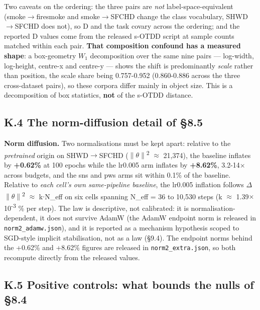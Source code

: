 \documentclass[pdflatex,sn-mathphys-ay]{sn-jnl}
\begin{document}
Two caveats on the ordering: the three pairs are \emph{not} label-space-equivalent (smoke\ensuremath{\rightarrow}firesmoke and smoke\ensuremath{\rightarrow}SFCHD change the class vocabulary, SHWD\ensuremath{\rightarrow}SFCHD does not), so D and the task covary across the ordering; and the reported D values come from the released s-OTDD script at sample counts matched within each pair. \textbf{That composition confound has a measured shape}: a box-geometry $W_1$ decomposition over the same nine pairs --- log-width, log-height, centre-x and centre-y --- shows the shift is predominantly \emph{scale} rather than position, the scale share being 0.757-0.952 (0.860-0.886 across the three cross-dataset pairs), so these corpora differ mainly in object size. This is a decomposition of box statistics, \textbf{not} of the s-OTDD distance.

\subsection*{K.4 The norm-diffusion detail of \S{}8.5}

\textbf{Norm diffusion.} Two normalisations must be kept apart: relative to the \emph{pretrained} origin on SHWD\ensuremath{\rightarrow}SFCHD (\ensuremath{\|}\ensuremath{\theta}\ensuremath{\|}\textsuperscript{2} \ensuremath{\approx} 21,374), the baseline inflates by \textbf{+0.62\%} at 100 epochs while the lr0.005 arm inflates by \textbf{+8.62\%}, 3.2-14\ensuremath{\times} across budgets, and the sns and pws arms sit within 0.1\% of the baseline. Relative to \emph{each cell's own same-pipeline baseline}, the lr0.005 inflation follows \ensuremath{\Delta}\ensuremath{\|}\ensuremath{\theta}\ensuremath{\|}\textsuperscript{2} \ensuremath{\approx} k\ensuremath{\cdot}N\_eff on six cells spanning N\_eff = 36 to 10,530 steps (k \ensuremath{\approx} 1.39\ensuremath{\times}10\textsuperscript{-3} \% per step). The law is descriptive, not calibrated: it is normalisation-dependent, it does not survive AdamW (the AdamW endpoint norm is released in \texttt{norm2\_adamw.json}), and it is reported as a mechanism hypothesis scoped to SGD-style implicit stabilisation, not as a law (\S{}9.4). The endpoint norms behind the +0.62\% and +8.62\% figures are released in \texttt{norm2\_extra.json}, so both recompute directly from the released values.

\subsection*{K.5 Positive controls: what bounds the nulls of \S{}8.4}
\end{document}
